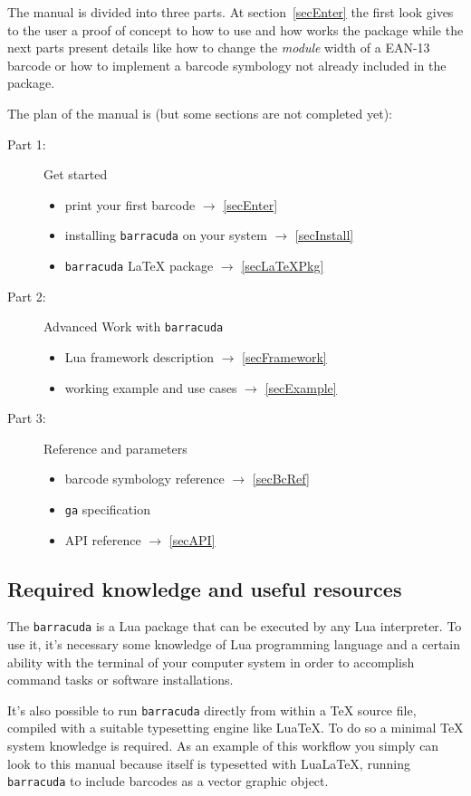 \documentclass[11pt]{article}
\newcommand{\code}[1]{\texttt{#1}}
\newcommand{\brcd}{\code{barracuda}}
\begin{document}
The manual is divided into three parts. At section~\ref{secEnter} the first look
gives to the user a proof of concept to how to use and how works the package
while the next parts present details like how to change the \emph{module} width
of a EAN-13 barcode or how to implement a barcode symbology not already included
in the package.

The plan of the manual is (but some sections are not completed yet):
\begin{description}
\item[Part 1:] Get started
\begin{itemize}
	\item print your first barcode \( \to \) \ref{secEnter}
	\item installing \brcd{} on your system \( \to \) \ref{secInstall}
	\item \brcd{} \LaTeX{} package \( \to \) \ref{secLaTeXPkg}
\end{itemize}
\item[Part 2:] Advanced Work with \brcd{}
\begin{itemize}
	\item Lua framework description \( \to \) \ref{secFramework}
	\item working example and use cases \( \to \) \ref{secExample}
\end{itemize}
\item[Part 3:] Reference and parameters
\begin{itemize}
	\item barcode symbology reference \( \to \) \ref{secBcRef}
	\item \code{ga} specification
	\item API reference \( \to \) \ref{secAPI}
\end{itemize}
\end{description}

\subsection{Required knowledge and useful resources}

The \brcd{} is a Lua package that can be executed by any Lua interpreter. To use
it, it's necessary some knowledge of Lua programming language and a certain
ability with the terminal of your computer system in order to accomplish command
tasks or software installations.

It's also possible to run \brcd{} directly from within a \TeX{} source file,
compiled with a suitable typesetting engine like Lua\TeX{}. To do so a minimal
\TeX{} system knowledge is required. As an example of this workflow you simply
can look to this manual because itself is typesetted with LuaLa\TeX{}, running
\brcd{} to include barcodes as a vector graphic object.
\end{document}
